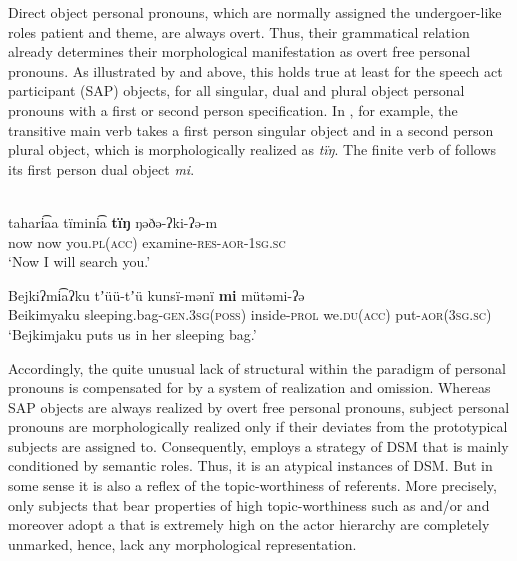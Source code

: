 \documentclass[output=paper]{LSP/langsci}
\begin{document}
Direct object personal pronouns, which are normally assigned the undergoer-like roles patient and theme, are always overt. Thus, their grammatical relation already determines their morphological manifestation as overt free personal pronouns. As illustrated by  and  above, this holds true at least for the speech act participant (SAP) objects, \ie for all singular, dual and plural object personal pronouns with a first or second person specification. 
In , for example, the transitive main verb takes a first person singular object and in  a second person plural object, which is morphologically realized as \textit{tïŋ}. The finite verb of  follows its first person dual object \textit{mi}. 

\ea \label{12-wr-ex:6}
\\

\ea \label{12-wr-ex:6a} 
\gll tahari͡aa tïmini͡a \textbf{tïŋ}  ŋəðə-ʔki-ʔə-m\\
 now now you.\textsc{pl(acc)} examine-\textsc{res-aor-1sg.sc}\\
\glt  ‘Now I will search you.’

\ex \label{12-wr-ex:6b} 
\gll Bejkiʔmi͡aʔku tʼüü-tʼü kunsï-mənï \textbf{mi}  mütəmi-ʔə\\
 Beikimyaku sleeping.bag-\textsc{gen.3sg(poss)} inside-\textsc{prol} we.\textsc{du(acc)} put-\textsc{aor(3sg.sc)}\\

\glt ‘Bejkimjaku puts us in her sleeping bag.’
\z
\z

Accordingly, the quite unusual lack of structural  within the  paradigm of personal pronouns is compensated for by a system of realization and omission. Whereas SAP objects are always realized by overt free personal pronouns, subject personal pronouns are morphologically realized only if their  deviates from the  prototypical subjects are assigned to. Consequently,  employs a strategy of DSM that is mainly conditioned by semantic roles. 
Thus, it is an atypical instances of DSM. But in some sense it is also a reflex of the topic-worthiness of referents. More precisely, only  subjects that bear properties of high topic-worthiness such as  and/or  and moreover adopt a  that is extremely high on the actor hierarchy are completely unmarked, hence, lack any morphological representation. 
\end{document}
